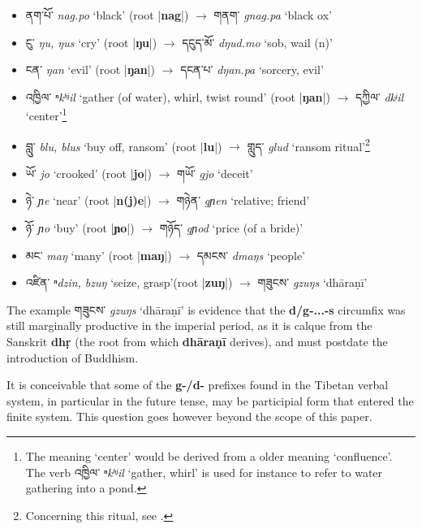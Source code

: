\documentclass[oneside,a4paper,11pt]{article}
\newcommand{\ipa}[1]{\textbf{{\phon\mbox{#1}}}} %
\newcommand{\tibet}[3]{{\tibetain#1} \textit{\phon#2} `#3'}
\newcommand{\dhat}[1]{|\ipa{#1}|}
\begin{document}
\begin{itemize}
\item \tibet{ནག་པོ་}{nag.po}{black} (root \dhat{nag}) $\rightarrow$	\tibet{གནག་}{gnag.pa}{black ox} 	
\item \tibet{ངུ་}{ŋu, ŋus}{cry} (root \dhat{ŋu}) $\rightarrow$	\tibet{དངུད་མོ་}{dŋud.mo}{sob, wail (n)} 	
\item \tibet{ངན་}{ŋan}{evil} (root \dhat{ŋan}) $\rightarrow$	\tibet{དངན་པ་}{dŋan.pa}{sorcery, evil} 	
\item \tibet{འཁྱིལ་}{ⁿkʰʲil}{gather (of water), whirl, twist round} (root \dhat{ŋan}) $\rightarrow$	\tibet{དཀྱིལ་}{dkʲil}{center}\footnote{The meaning `center' would be derived from a older meaning `confluence'. The verb  \tibet{འཁྱིལ་}{ⁿkʰʲil}{gather, whirl} is used for instance to refer to water gathering into a pond. }
\item \tibet{བླུ་}{blu, blus}{buy off, ransom} (root \dhat{lu}) $\rightarrow$	\tibet{གླུད་}{glud}{ransom ritual}\footnote{Concerning this ritual, see \citet{karmay91glud}.}
\item \tibet{ཡོ་}{jo}{crooked} (root \dhat{jo}) $\rightarrow$	\tibet{གཡོ་}{gjo}{deceit}
\item \tibet{ཉེ་}{ɲe}{near} (root \dhat{n(j)e}) $\rightarrow$	\tibet{གཉེན་}{gɲen}{relative; friend}
\item \tibet{ཉོ་}{ɲo}{buy} (root \dhat{ɲo}) $\rightarrow$	\tibet{གཉོད་}{gɲod}{price (of a bride)}
\item \tibet{མང་}{maŋ}{many} (root \dhat{maŋ}) $\rightarrow$	\tibet{དམངས་}{dmaŋs}{people}
\item \tibet{འཛིན་}{ⁿdzin, bzuŋ}{seize, grasp}(root \dhat{zuŋ}) $\rightarrow$	\tibet{གཟུངས་}{gzuŋs}{dhāraṇī}
\end{itemize}
 
The example \tibet{གཟུངས་}{gzuŋs}{dhāraṇī} is evidence that the \ipa{d/g-...-s} circumfix was still marginally productive in the imperial period, as it is calque from the Sanskrit \ipa{dhṛ} (the root from which \ipa{dhāraṇī} derives),  and must postdate the introduction of Buddhism.

It is conceivable that some of the \ipa{g-/d-} prefixes found in the Tibetan verbal system, in particular in the future tense, may be participial form that entered the finite system. This question goes however beyond the scope of this paper.
\end{document}
